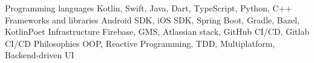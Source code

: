 
\begin{cvskills}
    \cvskill
        {Programming languages}
        {Kotlin, Swift, Java, Dart, TypeScript, Python, C++}
    \cvskill
        {Frameworks and libraries} 
        {Android SDK, iOS SDK, Spring Boot, Gradle, Bazel, KotlinPoet}
    \cvskill
        {Infrastructure}
        {Firebase, GMS, Atlassian stack, GitHub CI/CD, Gitlab CI/CD}
    \cvskill
        {Philosophies}
        {OOP, Reactive Programming, TDD, Multiplatform, Backend-driven UI}
\end{cvskills}